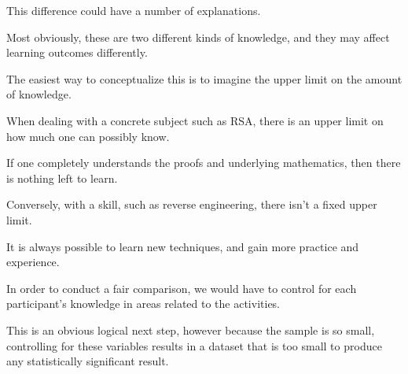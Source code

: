 This difference could have a number of explanations. %







Most obviously, these are two different kinds of knowledge, and they may affect learning outcomes differently. %







The easiest way to conceptualize this is to imagine the upper limit on the amount of knowledge. %







When dealing with a concrete subject such as RSA, there is an upper limit on how much one can possibly know. %







If one completely understands the proofs and underlying mathematics, then there is nothing left to learn. %







Conversely, with a skill, such as reverse engineering, there isn't a fixed upper limit. %







It is always possible to learn new techniques, and gain more practice and experience. 















        In order to conduct a fair comparison, we would have to control for each participant's knowledge in areas related to the activities. %







This is an obvious logical next step, however because the sample is so small, controlling for these variables results in a dataset that is too small to produce any statistically significant result. %







